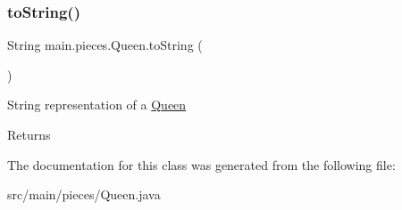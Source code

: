 \subsubsection{\texorpdfstring{to\+String()}{toString()}}
{\footnotesize\ttfamily String main.\+pieces.\+Queen.\+to\+String (\begin{DoxyParamCaption}{ }\end{DoxyParamCaption})}

String representation of a \hyperlink{classmain_1_1pieces_1_1_queen}{Queen} \begin{DoxyReturn}{Returns}

\end{DoxyReturn}


The documentation for this class was generated from the following file\+:\begin{DoxyCompactItemize}
\item 
src/main/pieces/Queen.\+java\end{DoxyCompactItemize}
